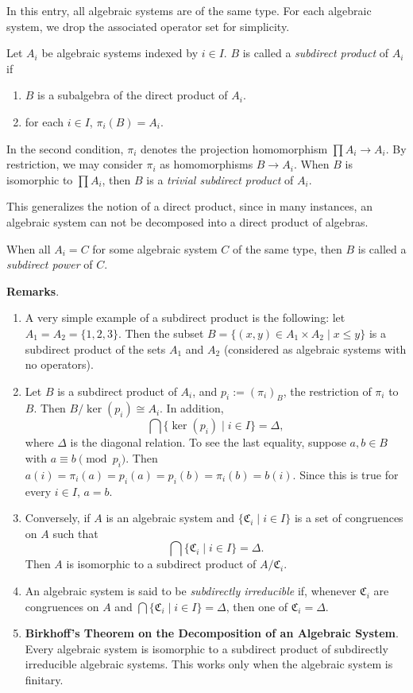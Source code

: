 \documentclass[12pt]{article}
\begin{document}
In this entry, all algebraic systems are of the same type.  For each algebraic system, we drop the associated operator set for simplicity.

Let $A_i$ be algebraic systems indexed by $i\in I$.  $B$ is called a \emph{subdirect product} of $A_i$ if
\begin{enumerate}
\item $B$ is a subalgebra of the direct product of $A_i$.
\item for each $i\in I$, $\pi_i(B)=A_i$.
\end{enumerate}
In the second condition, $\pi_i$ denotes the projection homomorphism $\prod A_i \to A_i$.  By restriction, we may consider $\pi_i$ as homomorphisms $B\to A_i$.  When $B$ is isomorphic to $\prod A_i$, then $B$ is a \emph{trivial subdirect product} of $A_i$.

This generalizes the notion of a direct product, since in many instances, an algebraic system can not be decomposed into a direct product of algebras.

When all $A_i=C$ for some algebraic system $C$ of the same type, then $B$ is called a \emph{subdirect power} of $C$.

\textbf{Remarks}.  
\begin{enumerate}
\item
A very simple example of a subdirect product is the following: let $A_1=A_2=\lbrace 1,2,3\rbrace$.  Then the subset $B=\lbrace (x,y)\in A_1\times A_2 \mid x\le y \rbrace$ is a subdirect product of the sets $A_1$ and $A_2$ (considered as algebraic systems with no operators).
\item 
Let $B$ is a subdirect product of $A_i$, and $p_i:=(\pi_i)_B$, the restriction of $\pi_i$ to $B$.  Then $B/\ker(p_i)\cong A_i$.  In addition, $$\bigcap \lbrace \ker(p_i)\mid i\in I\rbrace=\Delta,$$ where $\Delta$ is the diagonal relation.  To see the last equality, suppose $a,b\in B$ with $a\equiv b \pmod {p_i}$.  Then $a(i)=\pi_i(a)=p_i(a)=p_i(b)=\pi_i(b)=b(i)$.  Since this is true for every $i\in I$, $a=b$.
\item 
Conversely, if $A$ is an algebraic system and $\lbrace \mathfrak{C}_i\mid i\in I\rbrace$ is a set of congruences on $A$ such that $$\bigcap \lbrace \mathfrak{C}_i\mid i\in I\rbrace=\Delta.$$ 
Then $A$ is isomorphic to a subdirect product of $A/\mathfrak{C}_i$.
\item
An algebraic system is said to be \emph{subdirectly irreducible} if, whenever $\mathfrak{C}_i$ are congruences on $A$ and $\bigcap \lbrace \mathfrak{C}_i\mid i\in I\rbrace=\Delta$, then one of $\mathfrak{C}_i=\Delta$.
\item \textbf{Birkhoff's Theorem on the Decomposition of an Algebraic System}.  Every algebraic system is isomorphic to a subdirect product of subdirectly irreducible algebraic systems.  This works only when the algebraic system is finitary.
\end{enumerate}
\end{document}
